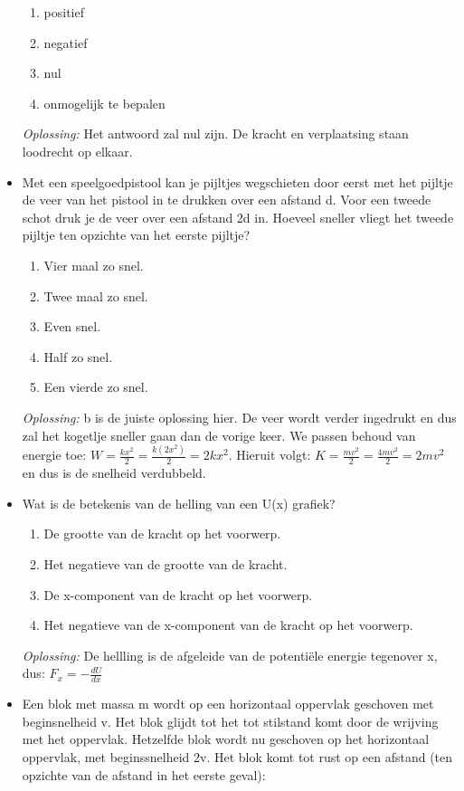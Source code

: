 \documentclass[12pt,a4paper]{article}
\begin{document}
\begin{itemize}
	\begin{enumerate}[label=\alph*]
		\item positief
		\item negatief
		\item nul
		\item onmogelijk te bepalen
	\end{enumerate}
	\textit{Oplossing:} Het antwoord zal nul zijn. De kracht en verplaatsing staan loodrecht op elkaar. 
	\newline
	\item Met een speelgoedpistool kan je pijltjes wegschieten door eerst met het pijltje de veer van het pistool in te drukken over een afstand d. Voor een tweede schot druk je de veer over een afstand 2d in. Hoeveel sneller vliegt het tweede pijltje ten opzichte van het eerste pijltje?
	\begin{enumerate}[label=\alph*]
		\item Vier maal zo snel.
		\item Twee maal zo snel.
		\item Even snel.
		\item Half zo snel.
		\item Een vierde zo snel.
	\end{enumerate}
	\textit{Oplossing:} b is de juiste oplossing hier. De veer wordt verder ingedrukt en dus zal het kogetlje sneller gaan dan de vorige keer. We passen behoud van energie toe: \(W = \frac{kx^2}{2} = \frac{k(2x^2)}{2} = 2kx^2\). Hieruit volgt: \(K = \frac{mv^2}{2} = \frac{4mv^2}{2} = 2mv^2\) en dus is de snelheid verdubbeld.
	\newline
	\item Wat is de betekenis van de helling van een U(x) grafiek?
	\begin{enumerate}[label=\alph*]
		\item De grootte van de kracht op het voorwerp.
		\item Het negatieve van de grootte van de kracht. 
		\item De x-component van de kracht op het voorwerp. 
		\item Het negatieve van de x-component van de kracht op het voorwerp. 
	\end{enumerate}
	\textit{Oplossing:} De hellling is de afgeleide van de potentiële energie tegenover x, dus: \(F_x = -\frac{dU}{dx}\)
	\newline
	\item Een blok met massa m wordt op een horizontaal oppervlak geschoven met beginsnelheid v. Het blok glijdt tot het tot stilstand komt door de wrijving met het oppervlak. Hetzelfde blok wordt nu geschoven op het horizontaal oppervlak, met beginssnelheid 2v. Het blok komt tot rust op een afstand (ten opzichte van de afstand in het eerste geval):

\end{itemize}
\end{document}
